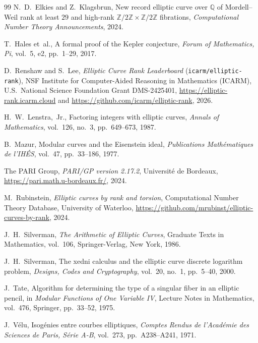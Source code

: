 \documentclass[10pt,a4paper]{article}
\theoremstyle{plain}
\theoremstyle{definition}
\theoremstyle{remark}
\begin{document}
\begin{thebibliography}{99}
N.~D.~Elkies and Z.~Klagsbrun,
New record elliptic curve over $\mathbb{Q}$ of Mordell--Weil rank at least $29$ and high-rank $\mathbb{Z}/2\mathbb{Z} \times \mathbb{Z}/2\mathbb{Z}$ fibrations,
\emph{Computational Number Theory Announcements}, 2024.

T.~Hales et~al.,
A formal proof of the Kepler conjecture,
\emph{Forum of Mathematics, Pi}, vol.~5, e2, pp.~1--29, 2017.

D.~Renshaw and S.~Lee,
\emph{Elliptic Curve Rank Leaderboard} (\texttt{icarm/elliptic-rank}),
NSF Institute for Computer-Aided Reasoning in Mathematics (ICARM), U.S.\ National Science Foundation Grant DMS-2425401, \url{https://elliptic-rank.icarm.cloud} and \url{https://github.com/icarm/elliptic-rank}, 2026.

H.~W.~Lenstra,~Jr.,
Factoring integers with elliptic curves,
\emph{Annals of Mathematics}, vol.~126, no.~3, pp.~649--673, 1987.

B.~Mazur,
Modular curves and the Eisenstein ideal,
\emph{Publications Math\'{e}matiques de l'IH\'{E}S}, vol.~47, pp.~33--186, 1977.

The PARI Group,
\emph{PARI/GP version 2.17.2},
Universit\'{e} de Bordeaux, \url{https://pari.math.u-bordeaux.fr/}, 2024.

M.~Rubinstein,
\emph{Elliptic curves by rank and torsion},
Computational Number Theory Database, University of Waterloo, \url{https://github.com/mrubinst/elliptic-curves-by-rank}, 2024.

J.~H.~Silverman,
\emph{The Arithmetic of Elliptic Curves},
Graduate Texts in Mathematics, vol.~106, Springer-Verlag, New York, 1986.

J.~H.~Silverman,
The xedni calculus and the elliptic curve discrete logarithm problem,
\emph{Designs, Codes and Cryptography}, vol.~20, no.~1, pp.~5--40, 2000.

J.~Tate,
Algorithm for determining the type of a singular fiber in an elliptic pencil,
in \emph{Modular Functions of One Variable IV}, Lecture Notes in Mathematics, vol.~476, Springer, pp.~33--52, 1975.

J.~V\'{e}lu,
Isog\'{e}nies entre courbes elliptiques,
\emph{Comptes Rendus de l'Acad\'{e}mie des Sciences de Paris, S\'{e}rie A-B}, vol.~273, pp.~A238--A241, 1971.

\end{thebibliography}
\end{document}
